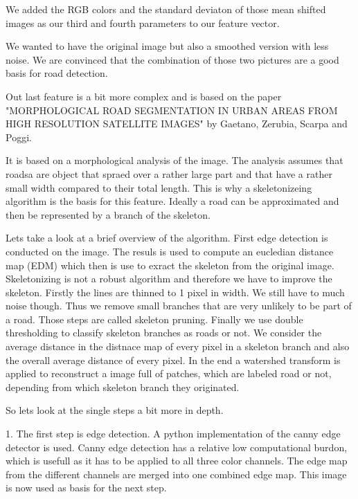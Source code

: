 \documentclass[10pt,conference,compsocconf]{IEEEtran}
\begin{document}
We added the RGB colors and the standard deviaton of those mean shifted images as our third and fourth parameters to our feature vector. 

We wanted to have the original image but also a smoothed version with less noise. We are convinced that the combination of those two pictures are a good basis for road detection.




Out last feature is a bit more complex and is based on the paper "MORPHOLOGICAL ROAD SEGMENTATION IN URBAN AREAS FROM HIGH RESOLUTION SATELLITE IMAGES" by Gaetano, Zerubia, Scarpa and Poggi.

It is based on a morphological analysis of the image. The analysis assumes that roadsa are object that spraed over a rather large part and that have a rather small width compared to their total length. This is why a skeletonizeing algorithm is the basis for this feature. Ideally a road can be approximated and then be represented by a branch of the skeleton.

Lets take a look at a brief overview of the algorithm. First edge detection is conducted on the image. The resuls is used to compute an eucledian distance map (EDM) which then is use to exract the skeleton from the original image. Skeletonizing is not a robust algorithm and therefore we have to improve the skeleton. Firstly the lines are thinned to 1 pixel in width. We still have to much noise though. Thus we remove small branches that are very unlikely to be part of a road. Those steps are called skeleton pruning. Finally we use double thresholding to classify skeleton branches as roads or not. We consider the average distance in the distnace map of every pixel in a skeleton branch and also the overall average distance of every pixel. In the end a watershed transform is applied to reconstruct a image full of patches, which are labeled road or not, depending from which skeleton branch they originated.


So lets look at the single steps a bit more in depth.

1. The first step is edge detection. A python implementation of the canny edge detector is used. Canny edge detection has a relative low computational burdon, which is usefull as it has to be applied to all three color channels. The edge map from the different channels are merged into one combined edge map. This image is now used as basis for the next step.
\end{document}
